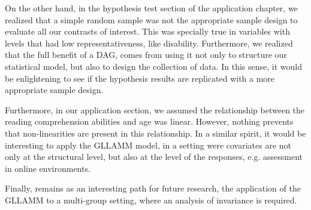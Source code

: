 On the other hand, in the hypothesis test section of the application chapter, we realized that a simple random sample was not the appropriate sample design to evaluate all our contrasts of interest. This was specially true in variables with levels that had low representativeness, like disability. Furthermore, we realized that the full benefit of a DAG, comes from using it not only to structure our statistical model, but also to design the collection of data. In this sense, it would be enlightening to see if the hypothesis results are replicated with a more appropriate sample design. 

Furthermore, in our application section, we assumed the relationship between the reading comprehension abilities and age was linear. However, nothing prevents that non-linearities are present in this relationship. In a similar spirit, it would be interesting to apply the GLLAMM model, in a setting were covariates are not only at the structural level, but also at the level of the responses, e.g. assessment in online environments.

Finally, remains as an interesting path for future research, the application of the GLLAMM to a multi-group setting, where an analysis of invariance is required.

